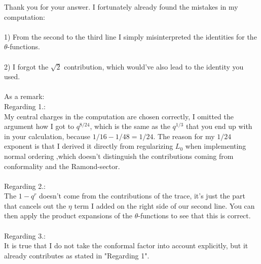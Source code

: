 \documentclass[11pt, xcolor=dvipsnames,aspectratio=169]{beamer}
\begin{document}
\begin{frame}
    Thank you for your answer. I fortunately already found the mistakes in my computation: \\ \\
1) From the second to the third line I simply misinterpreted the identities for the \(\theta \)-functions.\\ \\
2) I forgot the \(\sqrt{2}\) contribution, which would've also lead to the identity you used.\\ \\
As a remark: \\
Regarding 1.:\\
My central charges in the computation are chosen correctly, I omitted the argument how I got to \(q^{8/24}\), which is the same as the \(q^{1/3}\) that you end up with in your calculation, because \(1/16-1/48 = 1/24\). The reason for my \(1/24\) exponent is that I derived it directly from regularizing \(L_0\) when implementing normal ordering ,which doesn't distinguish the contributions coming from conformality and the Ramond-sector.\\ \\ 
Regarding 2.:\\
The \(1-q^r\) doesn't come from the contributions of the trace, it's just the part that cancels out the \(\eta\) term I added on the right side of our second line. You can then apply the product expansions of the \(\theta \)-functions to see that this is correct.\\ \\
Regarding 3.:\\
It is true that I do not take the conformal factor into account explicitly, but it already contributes as stated in "Regarding 1".
\end{frame}
\end{document}
